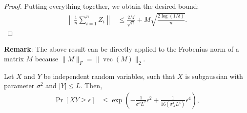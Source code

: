 \documentclass[tablecaption=bottom]{jmlr}
\DeclareMathOperator{\vvec} {vec}
\begin{document}
\begin{proof}
Putting everything together, we obtain the desired bound:
\begin{align}
\left\|\frac{1}{n}\sum_{i=1}^n Z_i \right\|
&\le \frac{2M}{\sqrt{n}} + M \sqrt{\frac{2\log(1/\delta)}{n}}.
\end{align}
\end{proof}


\textbf{Remark}: The above result can be directly
applied to the Frobenius norm of a matrix
$M$ because $\|M\|_F = \|\vvec(M)\|_2$.

\begin{lemma}
  \label{lemma:conc-prod}
  Let $X$ and $Y$ be independent random variables, such that $X$ is subgaussian with parameter $\sigma^2$ and $|Y| \le L$.
  Then, 
  \begin{align*}
    \Pr[ XY \ge \epsilon ] 
      &\le 
        \exp\left( - \frac{1}{\sigma^2 L^2} \epsilon^{2} 
          + \frac{1}{16 (\sigma^4_X L^4)} \epsilon^{4} \right),
  \end{align*}
\end{lemma}
\end{document}
